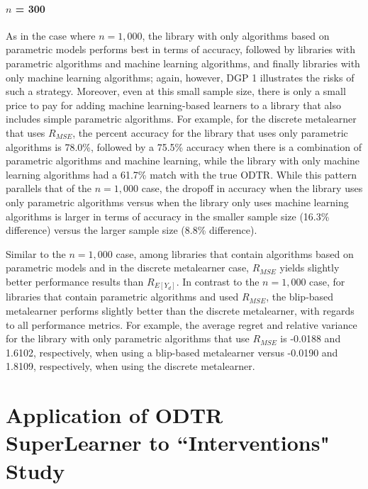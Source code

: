 \documentclass[a4paper,12pt]{article}
\begin{document}
\paragraph{$n$ = 300}

As in the case where $n = 1,000$, the library with only algorithms based on parametric models performs best in terms of accuracy, followed by libraries with parametric algorithms and machine learning algorithms, and finally libraries with only machine learning algorithms; again, however, DGP 1 illustrates the risks of such a strategy. Moreover, even at this small sample size, there is only a small price to pay for adding machine learning-based learners to a library that also includes simple parametric algorithms. For example, for the discrete metalearner that uses $R_{MSE}$, the percent accuracy for the library that uses only parametric algorithms is 78.0\%, followed by a 75.5\% accuracy when there is a combination of parametric algorithms and machine learning, while the library with only machine learning algorithms had a 61.7\% match with the true ODTR. While this pattern parallels that of the $n = 1,000$ case, the dropoff in accuracy when the library uses only parametric algorithms versus when the library only uses machine learning algorithms is larger in terms of accuracy in the smaller sample size (16.3\% difference) versus the larger sample size (8.8\% difference).



Similar to the $n = 1,000$ case, among libraries that contain algorithms based on parametric models and in the discrete metalearner case, $R_{MSE}$ yields slightly better performance results than $R_{E[Y_d]}$. In contrast to the $n = 1,000$ case, for libraries that contain parametric algorithms and used $R_{MSE}$, the blip-based metalearner performs slightly better than the discrete metalearner, with regards to all performance metrics. For example, the average regret and relative variance for the library with only parametric algorithms that use $R_{MSE}$ is  -0.0188 and 1.6102, respectively, when using a blip-based metalearner versus -0.0190 and 1.8109, respectively, when using the discrete metalearner.



\section{Application of ODTR SuperLearner to ``Interventions" Study}
\end{document}
